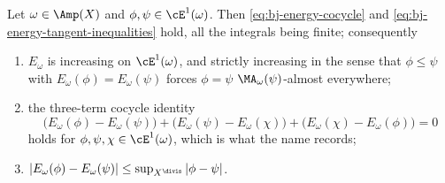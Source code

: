 \begin{proposition}
\label{prop:ch46-cocycle}
Let $\omega\in\Amp(X)$ and $\phi,\psi\in\cE^1(\omega)$.  Then
\eqref{eq:bj-energy-cocycle} and
\eqref{eq:bj-energy-tangent-inequalities} hold, all the integrals being
finite; consequently
\begin{enumerate}
\item\label{itm:ch46-coc:mono}
      $E_\omega$ is increasing on $\cE^1(\omega)$, and strictly
      increasing in the sense that $\phi\le\psi$ with
      $E_\omega(\phi)=E_\omega(\psi)$ forces $\phi=\psi$
      $\MA_\omega(\psi)$-almost everywhere;
\item\label{itm:ch46-coc:cocycle}
      the three-term cocycle identity
      \[
       \bigl(E_\omega(\phi)-E_\omega(\psi)\bigr)
       +\bigl(E_\omega(\psi)-E_\omega(\chi)\bigr)
       +\bigl(E_\omega(\chi)-E_\omega(\phi)\bigr)=0
      \]
      holds for $\phi,\psi,\chi\in\cE^1(\omega)$, which is what the name
      records;
\item\label{itm:ch46-coc:lipschitz}
      $|E_\omega(\phi)-E_\omega(\psi)|
        \le\sup_{X^{\divis}}|\phi-\psi|$.
\end{enumerate}
\end{proposition}

